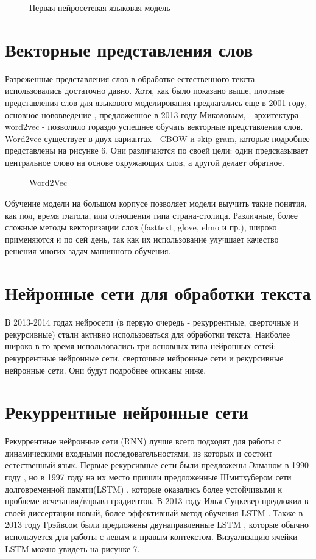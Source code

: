 \begin{figure}[ht]
  \caption{Первая нейросетевая языковая модель}\label{fig:Neuro1-Feedforward}
\end{figure}


\section{Векторные представления слов}
Разреженные представления слов в обработке естественного текста использовались достаточно давно. Хотя, как было показано выше, плотные представления слов для языкового моделирования предлагались еще в 2001 году, основное нововведение \cite{mikolov_2013}, предложенное в 2013 году Миколовым, - архитектура word2vec - позволило гораздо успешнее обучать векторные представления слов. Word2vec существует в двух вариантах - CBOW и skip-gram, которые подробнее представлены на рисунке 6. Они различаются по своей цели: один предсказывает центральное слово на основе окружающих слов, а другой делает обратное.


\begin{figure}[ht]
  \caption{Word2Vec}\label{fig:Neuro2-Word2Vec}
\end{figure}

Обучение модели на большом корпусе позволяет модели выучить такие понятия, как пол, время глагола, или отношения типа страна-столица. Различные, более сложные методы векторизации слов (fasttext, glove, elmo и пр.), широко применяются и по сей день, так как их использование улучшает качество решения многих задач машинного обучения.


\section{Нейронные сети для обработки текста}
В 2013-2014 годах нейросети (в первую очередь - рекуррентные, сверточные и рекурсивные) стали активно использоваться для обработки текста.  Наиболее широко в то время использовались три основных типа нейронных сетей: рекуррентные нейронные сети, сверточные нейронные сети и рекурсивные нейронные сети. Они будут подробнее описаны ниже.

\section{Рекуррентные нейронные сети}
Рекуррентные нейронные сети (RNN) лучше всего подходят для работы с динамическими входными последовательностями, из которых и состоит естественный язык.  Первые рекурсивные сети были предложены Элманом в 1990 году \cite{elman_1990}, но в 1997 году на их место пришли предложенные Шмитхубером сети долговременной памяти(LSTM) \cite{hochreiter_1997}, которые оказались более устойчивыми к проблеме исчезания/взрыва градиентов. В 2013 году Илья Суцкевер предложил в своей диссертации новый, более эффективный метод обучения LSTM \cite{suskever_2013}. Также в 2013 году Грэйвсом были предложены двунаправленные LSTM \cite{graves_2013}, которые обычно используется для работы с левым и правым контекстом. Визуализацию ячейки LSTM можно увидеть на рисунке 7.  



